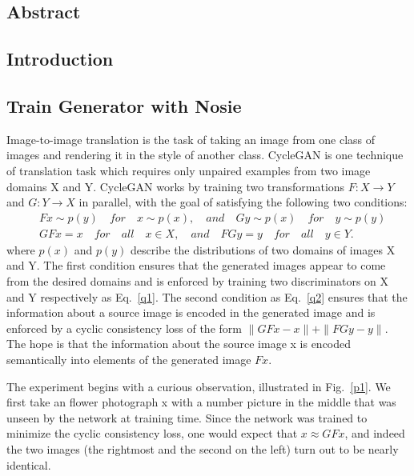 \documentclass[a4paper]{article}
\begin{document}
	\subsection{Abstract}
	
	\subsection{Introduction}
	
	\subsection{Train Generator with Nosie}
	
	Image-to-image translation is the task of taking an image from one class of images and rendering it in the style of another class. CycleGAN is one technique of translation task which requires only unpaired examples from two image domains X and Y. CycleGAN works by training two transformations $F: X\rightarrow Y $and $G: Y\rightarrow X $ in parallel, with the goal of satisfying the following two conditions: 
	\begin{align}
    & F x\sim p(y)\quad for\quad x\sim p(x), \quad and\quad G y\sim p(x) \quad for\quad  y\sim p(y)  \label{q1} \\ 
    & GF x = x\quad for\quad all\quad x\in X, \quad and\quad FGy = y\quad for\quad all\quad  y\in Y.  \label{q2}
	\end{align} 
	where $p(x)$ and $p(y)$ describe the distributions of two domains of images X and Y. The first condition ensures that the generated images appear to come from the desired domains and is enforced by training two discriminators on X and Y respectively as Eq.~\ref{q1}. The second condition as Eq.~\ref{q2} ensures that the information about a source image is encoded in the generated image and is enforced by a cyclic consistency loss of the form $\parallel GF x-x\parallel + \parallel F Gy-y\parallel$. The hope is that the information about the source image x is encoded semantically into elements of the generated image $F x$.
	
	The experiment begins with a curious observation, illustrated in Fig.~\ref{p1}. We first take an flower photograph x with a number picture in the middle that	was unseen by the network at training time. Since the network was trained to minimize the cyclic consistency loss, one would expect that $x\approx GF x$, and indeed the two images (the rightmost and the second on the left) turn out to be nearly	identical.
	
\end{document}
